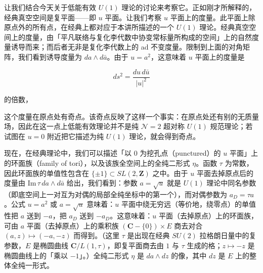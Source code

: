 
让我们结合今天关于低能有效 $U(1)$ 理论的讨论来考察它。正如刚才所解释的，经典真空空间是复平面——即 $u$ 平面。让我们考察 $u$ 平面上的度量。此平面上除原点外的所有点，在经典上都对应于本讲所描述的一个 $U(1)$ 理论。经典真空空间上的度量，由「平凡联络与复化李代数中协变常标量所构成的空间」上的自然度量诱导而来；而后者无非是复化李代数上的 ad 不变度量。限制到上面的对角矩阵，我们看到诱导度量为 $da\wedge d\bar a$。由于 $u=a^2$，这意味着 $u$ 平面上的度量是

\[
  ds^2=\frac{du\,d\bar u}{|u|^2}
\]

的倍数，



这个度量在原点处有奇点。该奇点反映了这样一个事实：在原点处还有别的无质量场，因此在这一点上低能有效理论并不是纯 $\mathcal{N}=2$ 超对称 $U(1)$ 规范理论；若试图在 $u=0$ 附近把它描述为纯 $U(1)$ 理论，就会得到奇点。

现在，在经典理论中，我们可以描述「以 $0$ 为挖孔点（punctured）的 $u$ 平面」上的环面族（family of tori），以及该族全空间上的全纯二形式 $\eta$。函数 $\tau$ 为常数，因此环面族的单值性包含在 $\{\pm1\}\subset SL(2,\mathbf{Z})$ 之中。由于 $u$ 平面去掉原点后的度量由 $\mathrm{Im}\,\tau\,da\wedge d\bar a$ 给出，我们看到：参数 $a=\sqrt u$ 就是 $U(1)$ 理论中同名参数（即底空间上一对互为对偶的局部全纯坐标中的第一个），而对偶参数为 $a_D=\tau a$。公式 $u=a^2$ 或 $a=\sqrt u$ 意味着：$u$ 平面中绕无穷远（等价地，绕零点）的单值性把 $a$ 送到 $-a$，把 $a_D$ 送到 $-a_D$。这意味着：$u$ 平面（去掉原点）上的环面族，可由 $a$ 平面（去掉原点）上的乘积族 $(\mathbf{C}-\{0\})\times E$ 商去对合 $(a,z)\mapsto(-a,-z)$ 而得到。（这里 $\tau$ 是出现在经典 $SU(2)$ 拉格朗日量中的复参数，$E$ 是椭圆曲线 $\mathbf{C}/L(1,\tau)$，即复平面商去由 $1$ 与 $\tau$ 生成的格；$z\mapsto-z$ 是椭圆曲线上的「乘以 $-1$」。）全纯二形式 $\eta$ 是 $da\wedge dz$ 的像，其中 $dz$ 是 $E$ 上的整体全纯一形式。

